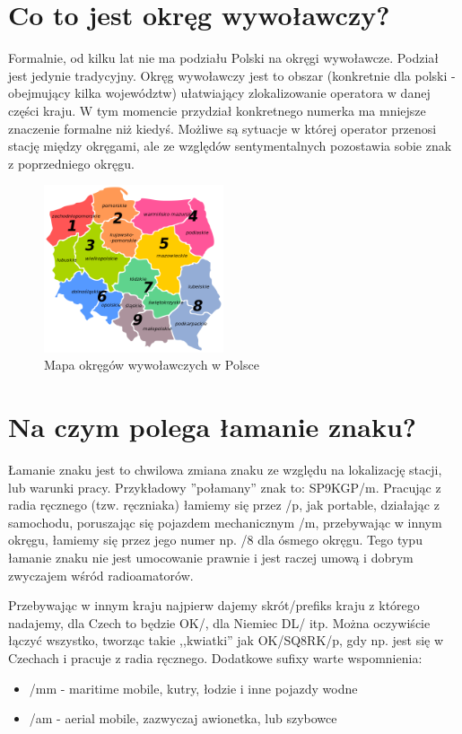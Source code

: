 \documentclass[a4paper,12pt]{article}
\begin{document}
\section{Co to jest okręg wywoławczy?}
Formalnie, od kilku lat nie ma podziału Polski na okręgi wywoławcze. Podział jest jedynie tradycyjny. Okręg wywoławczy jest to obszar (konkretnie dla polski - obejmujący kilka województw) ułatwiający zlokalizowanie operatora w danej części kraju. W tym momencie przydział konkretnego numerka ma mniejsze znaczenie formalne niż kiedyś. Możliwe są sytuacje w której operator przenosi stację między okręgami, ale ze względów sentymentalnych pozostawia sobie znak z poprzedniego okręgu. 
\begin{figure}[h]
 \centering
 \includegraphics[width=150pt]{./Polish_HAM_Radio_Regions.png}
 \caption{Mapa okręgów wywoławczych w Polsce}
\end{figure}

\section{Na czym polega łamanie znaku?}
Łamanie znaku jest to chwilowa zmiana znaku ze względu na lokalizację stacji, lub warunki pracy. Przykładowy ”połamany” znak to: SP9KGP/m. Pracując z radia ręcznego (tzw. ręczniaka) łamiemy się przez /p, jak portable, działając z samochodu, poruszając się pojazdem mechanicznym /m, przebywając w innym okręgu, łamiemy się przez jego numer np. /8 dla ósmego okręgu. Tego typu łamanie znaku nie jest umocowanie prawnie i jest raczej umową i dobrym zwyczajem wśród radioamatorów.

Przebywając w innym kraju najpierw dajemy skrót/prefiks kraju z którego nadajemy, dla Czech to będzie OK/, dla Niemiec DL/ itp. Można oczywiście łączyć wszystko, tworząc takie ,,kwiatki'' jak OK/SQ8RK/p, gdy np. jest się w Czechach i pracuje z radia ręcznego.
Dodatkowe sufixy warte wspomnienia:
\begin{itemize}
\item /mm - maritime mobile, kutry, łodzie i inne pojazdy wodne
\item /am - aerial mobile, zazwyczaj awionetka, lub szybowce\end{itemize}
\end{document}
